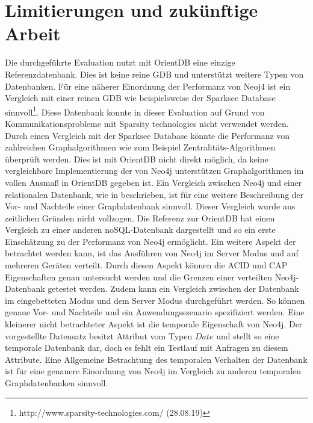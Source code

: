 \section{Limitierungen und zukünftige Arbeit}
Die durchgeführte Evaluation nutzt mit OrientDB  eine einzige Referenzdatenbank. Dies ist keine reine GDB und unterstützt weitere Typen von Datenbanken. Für eine näherer Einordnung der Performanz von Neoj4 ist ein Vergleich mit einer reinen GDB wie beispielsweise der Sparksee Database sinnvoll\footnote{http://www.sparsity-technologies.com/ (28.08.19)}. Diese Datenbank konnte in dieser Evaluation auf Grund von Kommunikationsprobleme mit Sparsity technologies nicht verwendet werden. Durch einen Vergleich mit der Sparksee Database könnte die Performanz von zahlreichen Graphalgorithmen   wie zum Beispiel Zentralitäts-Algorithmen überprüft werden. Dies ist mit OrientDB nicht direkt möglich, da keine vergleichbare Implementierung der von Neo4j unterstützen Graphalgorithmen im vollen Ausmaß in OrientDB gegeben ist. \newline 
Ein Vergleich zwischen Neo4j und einer relationalen Datenbank, wie in \parencite{vicknair2010comparison} beschrieben, ist für eine weitere Beschreibung der Vor- und Nachteile einer Graphdatenbank sinnvoll. Dieser Vergleich wurde aus zeitlichen Gründen nicht vollzogen. Die Referenz zur OrientDB hat einen Vergleich zu einer anderen noSQL-Datenbank dargestellt und so ein erste Einschätzung zu der Performanz von Neo4j ermöglicht. \newline
Ein weitere Aspekt der betrachtet werden kann, ist das Ausführen von Neo4j im Server Modus und auf mehreren Geräten verteilt. Durch diesen Aspekt können die ACID und CAP Eigenschaften genau untersucht werden und die Grenzen einer verteilten Neo4j-Datenbank getestet werden. Zudem kann ein Vergleich zwischen der Datenbank im eingebetteten Modus und dem Server Modus durchgeführt werden. So können genaue Vor- und Nachteile und ein Anwendungsszenario spezifiziert werden. \newline
Eine kleinerer nicht betrachteter Aspekt ist die temporale Eigenschaft von Neo4j. Der vorgestellte Datensatz besitzt Attribut vom Typen $Date$ und stellt so eine temporale Datenbank dar, doch es fehlt ein Testlauf mit Anfragen zu diesem Attribute. Eine Allgemeine Betrachtung des temporalen Verhalten der Datenbank ist für eine genauere Einordnung von Neo4j im Vergleich zu anderen temporalen Graphdatenbanken sinnvoll. 
